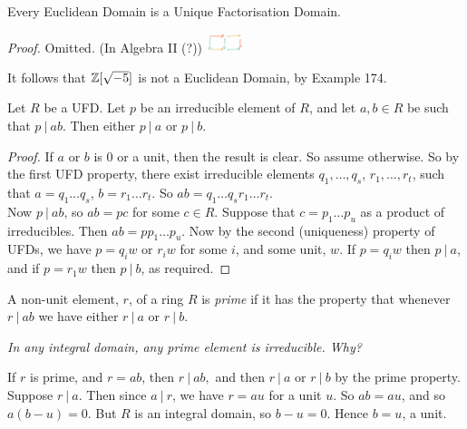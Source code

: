   
  
  \begin{theorem} Every Euclidean Domain is a Unique Factorisation Domain. %
  \end{theorem}

   \textit{Proof.} Omitted. (In Algebra II (?)) \includegraphics[width=0.08\textwidth]{al2.jpg} 

It follows that $\mathbb{Z}[\sqrt{-5}]$ is not a Euclidean Domain, by Example 174.


\begin{proposition} Let $R$ be a UFD. Let $p$ be an irreducible element of $R$, and let $a,b\in R$ be such that $p ~|~ ab$. Then either $p~|~ a$ or $p~|~ b$.	
\end{proposition}

\begin{proof}
If $a$ or $b$ is $0$ or a unit, then the result is clear. So assume otherwise. So by the first UFD property, there exist irreducible elements $q_1,\dots,q_s$, $r_1,\dots,r_t$, such that $a = q_1\dots q_s$, $b= r_1\dots r_t.$ So $ab = q_1\dots q_s r_1 \dots r_t$.\vspace*{5pt}\\ Now $p~|~ ab$, so $ab = pc$ for some $c \in R$. Suppose that $c = p_1\dots p_u$ as a product of irreducibles. Then $ab = pp_1\dots p_u$. Now by the second (uniqueness) property of UFDs, we have $p = q_iw$ or $r_i w$ for some $i$, and some unit, $w$. If $p = q_iw$ then $p~|~ a$, and if $p = r_1w$ then $p ~|~b$, as required.
\end{proof}

\begin{definition} A non-unit element, $r$, of a ring $R$ is \emph{prime} if it has the property that whenever $r ~|~ab$ we have either $r~|~ a$ or $r~|~b$.	
\end{definition}\vspace*{5pt}

 \textit{In any integral domain, any prime element is irreducible. Why?}

If $r$ is prime, and $r = ab$, then $r ~|~ ab,$ and then $r~|~ a$ or $r~|~b$ by the prime property. Suppose $r~|~a$. Then since $a ~|~ r$, we have $r = au$ for a unit $u$. So $ab = au$, and so $a(b-u) = 0$. But $R$ is an integral domain, so $b - u =0$. Hence $b = u$, a unit.

